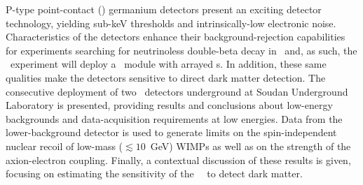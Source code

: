 P-type point-contact (\ppc) germanium detectors present an exciting detector technology,
yielding sub-keV thresholds and intrinsically-low electronic noise.  Characteristics of
the detectors enhance their background-rejection capabilities for experiments searching
for neutrinoless double-beta decay in \gersevensix~and, as such, the \MJ~experiment will 
deploy a \minmod~module with arrayed {\ppc}s.  In addition, these same
qualities make the detectors sensitive to direct dark matter detection.  The consecutive 
deployment of two \ppc~detectors underground at Soudan Underground Laboratory is presented, providing
results and conclusions about low-energy backgrounds and data-acquisition requirements at low energies. 
Data from the lower-background detector is used to generate limits on 
the spin-independent nuclear recoil of low-mass ($\lesssim10$~GeV) WIMPs as well as on 
the strength of the axion-electron coupling.  Finally, a contextual discussion
of these results is given, focusing on estimating the sensitivity of the 
\MJ~\minmod~to detect dark matter.
